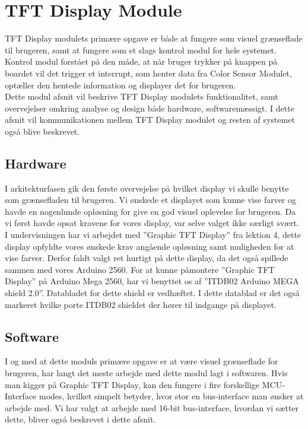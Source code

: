 \graphicspath{{Chapters/Struktur/}}

\section{TFT Display Module}
TFT Display modulets primære opgave er både at fungere som visuel grænseflade til brugeren, samt at fungere som et slags kontrol modul for hele systemet. Kontrol modul forstået på den måde, at når bruger trykker på knappen på boardet vil det trigger et interrupt, som henter data fra Color Sensor Modulet, optæller den hentede information og displayer det for brugeren.\\ Dette modul afsnit vil beskrive TFT Display modulets funktionalitet, samt overvejelser omkring analyse og design både hardware, softwaremæssigt. I dette afsnit vil kommunikationen mellem TFT Display modulet og resten af systemet også blive beskrevet. 

\subsection{Hardware}
I arkitekturfasen gik den første overvejelse på hvilket display vi skulle benytte som grænsefladen til brugeren. Vi ønskede et displayet som kunne vise farver og havde en nogenlunde opløsning for give en god visuel oplevelse for brugeren. Da vi først havde opsat kravene for vores display, var selve valget ikke særligt svært. I undervisningen har vi arbejdet med ”Graphic TFT Display” fra lektion 4, dette display opfyldte vores ønskede krav angående opløsning samt muligheden for at vise farver. Derfor faldt valgt ret hurtigt på dette display, da det også spillede sammen med vores Arduino 2560. For at kunne påmontere ”Graphic TFT Display” på Arduino Mega 2560, har vi benyttet os af ”ITDB02 Arduino MEGA shield 2.0”. Databladet for dette shield er vedhæftet\cite{man:ITDB02}. I dette datablad er det også markeret hvilke porte ITDB02 shieldet der hører til indgange på displayet.

\subsection{Software}
I og med at dette moduls primære opgave er at være visuel grænseflade for brugeren, har langt det meste arbejde med dette modul lagt i softwaren. 
Hvis man kigger på Graphic TFT Display, kan den fungere i fire forskellige MCU-Interface modes, hvilket simpelt betyder, hvor stor en bus-interface man ønsker at arbejde med. Vi har valgt at arbejde med 16-bit bus-interface, hvordan vi sætter dette, bliver også beskrevet i dette afsnit. 

